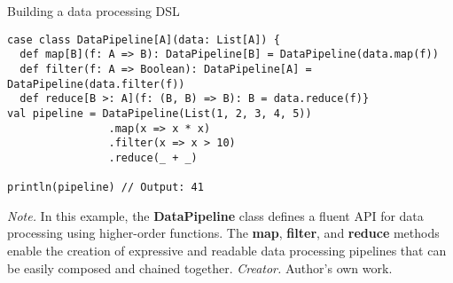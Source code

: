 \begin{table}[h!]
\caption{Building a data processing DSL}
\begin{lstlisting}
case class DataPipeline[A](data: List[A]) {
  def map[B](f: A => B): DataPipeline[B] = DataPipeline(data.map(f))
  def filter(f: A => Boolean): DataPipeline[A] = DataPipeline(data.filter(f))
  def reduce[B >: A](f: (B, B) => B): B = data.reduce(f)}
val pipeline = DataPipeline(List(1, 2, 3, 4, 5))
                .map(x => x * x)
                .filter(x => x > 10)
                .reduce(_ + _)

println(pipeline) // Output: 41
\end{lstlisting}
\small
\textit{Note.} In this example, the \textbf{DataPipeline} class defines a fluent API for data processing using higher-order functions. The \textbf{map}, \textbf{filter}, and \textbf{reduce} methods enable the creation of expressive and readable data processing pipelines that can be easily composed and chained together.
\textit{Creator.} Author's own work.
\end{table}